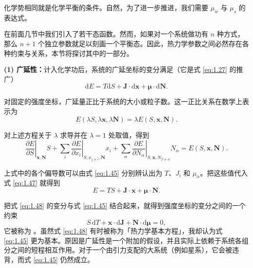 
化学势相同就是化学平衡的条件。自然，为了进一步推进，我们需要 $\mu_w$ 与 $\mu_s$ 的表达式。


在前面几节中我们引入了若干态函数。然而，如果对一个系统做功有 $n$ 种方式，那么 $n+1$ 个独立参数就足以刻画一个平衡态。因此，热力学参数之间必然存在各种约束与关系，本节将探讨其中的一部分。

\textbf{(1) 广延性：}\quad 计入化学功后，系统的广延坐标的变分满足（它是式 \eqref{eq:1.27} 的推广）
\begin{equation}
\mathrm{d}E=T\mathrm{d}S+\bm{J}\cdot\mathrm{d}\bm{x}+\bm{\mu}\cdot\mathrm{d}\bm{N}.
\label{eq:1.45}
\end{equation}

对固定的强度坐标，广延量正比于系统的大小或粒子数。这一正比关系在数学上表示为
\begin{equation}
E(\lambda S,\lambda\bm{x},\lambda\bm{N})=\lambda E(S,\bm{x},\bm{N}).
\label{eq:1.46}
\end{equation}

对上述方程关于 $\lambda$ 求导并在 $\lambda=1$ 处取值，得到
\begin{equation}
\left.\frac{\partial E}{\partial S}\right|_{\bm{x},\bm{N}}S+\sum_i\left.\frac{\partial E}{\partial x_i}\right|_{S,x_{j\neq i},\bm{N}}x_i+\sum_\alpha\left.\frac{\partial E}{\partial N_\alpha}\right|_{S,\bm{x},N_{\beta\neq\alpha}}N_\alpha=E(S,\bm{x},\bm{N}).
\label{eq:1.47}
\end{equation}

上式中的各个偏导数可以由式 \eqref{eq:1.45} 分别辨认出为 $T$、$J_i$ 和 $\mu_\alpha$。把这些值代入式 \eqref{eq:1.47} 就得到
\begin{equation}
E=TS+\bm{J}\cdot\bm{x}+\bm{\mu}\cdot\bm{N}.
\label{eq:1.48}
\end{equation}

把式 \eqref{eq:1.48} 的变分与式 \eqref{eq:1.45} 结合起来，就得到强度坐标的变分之间的一个约束
\begin{equation}
S\,\mathrm{d}T+\bm{x}\cdot\mathrm{d}\bm{J}+\bm{N}\cdot\mathrm{d}\bm{\mu}=0,
\label{eq:1.49}
\end{equation}
它被称为 。虽然式 \eqref{eq:1.48} 有时被称为「热力学基本方程」，我却认为式 \eqref{eq:1.45} 更为基本。原因是广延性是一个附加的假设，并且实际上依赖于系统各组分之间的短程相互作用。对于一个由引力支配的大系统（例如星系），它会被违背，而式 \eqref{eq:1.45} 仍然成立。

